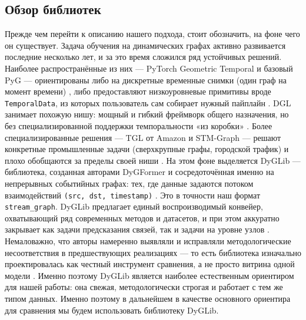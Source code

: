 \documentclass[a4paper,12pt]{extarticle}
\begin{document}
\subsection*{Обзор библиотек}

Прежде чем перейти к описанию нашего подхода, стоит обозначить, на фоне чего он
существует. Задача обучения на динамических графах активно развивается последние
несколько лет, и за это время сложился ряд устойчивых решений. Наиболее
распространённые из них — PyTorch Geometric Temporal и базовый PyG — ориентированы
либо на дискретные временные снимки (один граф на момент времени)
\cite{pytorch_geometric_temporal}, либо предоставляют низкоуровневые
примитивы вроде \texttt{TemporalData}, из которых пользователь сам собирает
нужный пайплайн \cite{pytorch_temporaldata_docs}. DGL занимает похожую нишу:
мощный и гибкий фреймворк общего назначения, но без специализированной поддержки
темпоральности «из коробки» \cite{dgl}. Более специализированные решения — TGL от
Amazon и STM-Graph — решают конкретные промышленные задачи (сверхкрупные графы,
городской трафик) и плохо обобщаются за пределы своей ниши \cite{tgl_amazon,stm_graph}.
На этом фоне выделяется DyGLib — библиотека, созданная авторами DyGFormer и
сосредоточённая именно на непрерывных событийных графах: тех, где данные задаются
потоком взаимодействий \texttt{(src, dst, timestamp)}
\cite{dyglib_openreview,dyglib_github}. Это в точности наш формат
\texttt{stream\_graph}. DyGLib предлагает единый воспроизводимый конвейер,
охватывающий ряд современных методов и датасетов, и при этом
аккуратно закрывает как задачи предсказания связей, так и задачи на уровне
узлов \cite{dyglib_openreview,dyglib_github}. Немаловажно, что авторы намеренно
выявляли и исправляли методологические несоответствия в предшествующих
реализациях — то есть библиотека изначально проектировалась как честный инструмент
сравнения, а не просто витрина одной модели \cite{dyglib_openreview,dyglib_github}.
Именно поэтому DyGLib является наиболее естественным ориентиром для нашей работы:
она свежая, методологически строгая и работает с тем же типом данных. Именно поэтому в
дальнейшем в качестве основного ориентира для сравнения мы будем использовать библиотеку DyGLib.
\end{document}

